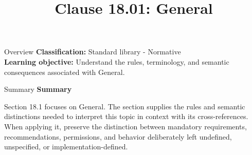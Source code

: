 \documentclass[10pt,letterpaper]{article}
\title{Clause 18.01: General}
\author{}
\date{}
\begin{document}
\maketitle
\begin{CornellOverviewBox}{Overview}
\textbf{Classification:} Standard library - Normative\\[2pt]
\textbf{Learning objective:} Understand the rules, terminology, and semantic consequences associated with General.
\end{CornellOverviewBox}\begin{CornellSummaryBox}{Summary}
{\sffamily\bfseries\color{Accent} Summary}\par\vspace{3pt}Section 18.1 focuses on General. The section supplies the rules and semantic distinctions needed to interpret this topic in context with its cross-references. When applying it, preserve the distinction between mandatory requirements, recommendations, permissions, and behavior deliberately left undefined, unspecified, or implementation-defined.
\end{CornellSummaryBox}
\end{document}
